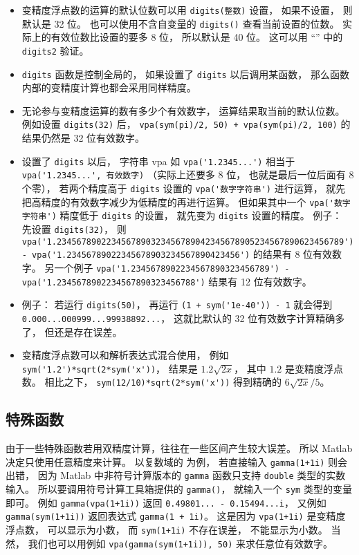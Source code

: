 \begin{itemize}
\item 变精度浮点数的运算的默认位数可以用 \verb`digits(整数)` 设置， 如果不设置， 则默认是 32 位。 也可以使用不含自变量的 \verb`digits()` 查看当前设置的位数。 实际上的有效位数比设置的要多 8 位， 所以默认是 40 位。 这可以用 “” 中的 \verb`digits2` 验证。

\item \verb`digits` 函数是控制全局的， 如果设置了 \verb`digits` 以后调用某函数， 那么函数内部的变精度计算也都会采用同样精度。

\item 无论参与变精度运算的数有多少个有效数字， 运算结果取当前的默认位数。 例如设置 \verb`digits(32)` 后， \verb`vpa(sym(pi)/2, 50) + vpa(sym(pi)/2, 100)` 的结果仍然是 32 位有效数字。

\item 设置了 \verb`digits` 以后， 字符串 vpa 如 \verb`vpa('1.2345...')` 相当于 \verb`vpa('1.2345...', 有效数字)` （实际上还要多 8 位， 也就是最后一位后面有 8 个零）， 若两个精度高于 \verb`digits` 设置的 \verb`vpa('数字字符串')` 进行运算， 就先把高精度的有效数字减少为低精度的再进行运算。 但如果其中一个 \verb`vpa('数字字符串')` 精度低于 \verb`digits` 的设置， 就先变为 \verb`digits` 设置的精度。 例子： 先设置 \verb`digits(32)`， 则 \verb`vpa('1.2345678902234567890323456789042345678905234567890623456789') - vpa('1.23456789022345678903234567890423456')` 的结果有 8 位有效数字。 另一个例子 \verb`vpa('1.2345678902234567890323456789') - vpa('1.2345678902234567890323456788')` 结果有 12 位有效数字。

\item 例子： 若运行 \verb`digits(50)`， 再运行 \verb`(1 + sym('1e-40')) - 1` 就会得到 \verb`0.000...000999...99938892...`， 这就比默认的 32 位有效数字计算精确多了， 但还是存在误差。

\item 变精度浮点数可以和解析表达式混合使用， 例如 \verb`sym('1.2')*sqrt(2*sym('x'))`， 结果是 $1.2 \sqrt{2x}$， 其中 $1.2$ 是变精度浮点数。 相比之下， \verb`sym(12/10)*sqrt(2*sym('x'))` 得到精确的 $6\sqrt{2x}/5$。
\end{itemize}

\subsection{特殊函数}
由于一些特殊函数若用双精度计算，往往在一些区间产生较大误差。 所以 Matlab 决定只使用任意精度来计算。 以复数域的  为例， 若直接输入 \verb`gamma(1+1i)` 则会出错， 因为 Matlab 中非符号计算版本的 \verb`gamma` 函数只支持 \verb`double` 类型的实数输入。 所以要调用符号计算工具箱提供的 \verb`gamma()`， 就输入一个 \verb`sym` 类型的变量即可。 例如 \verb`gamma(vpa(1+1i))` 返回 \verb`0.49801... - 0.15494...i`， 又例如 \verb`gamma(sym(1+1i))` 返回表达式 \verb`gamma(1 + 1i)`。 这是因为 \verb`vpa(1+1i)` 是变精度浮点数， 可以显示为小数， 而 \verb`sym(1+1i)` 不存在误差， 不能显示为小数。 当然， 我们也可以用例如 \verb`vpa(gamma(sym(1+1i)), 50)` 来求任意位有效数字。
